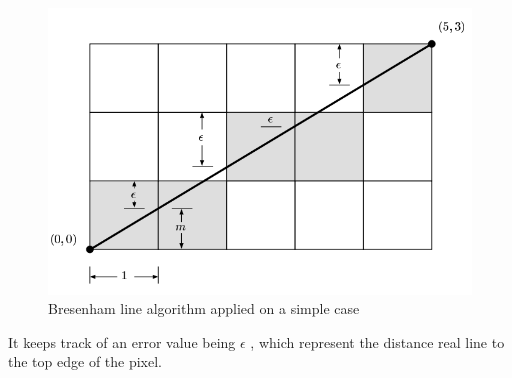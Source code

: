 \begin{figure}[H]
	\includegraphics[width = \textwidth]{images/bresenham}
	\caption{Bresenham line algorithm applied on a simple case}
	\label{fig:bresenham_line}
\end{figure}
It keeps track of an error value being $\epsilon$ , which represent the distance real line to the top edge of the pixel. 
 

